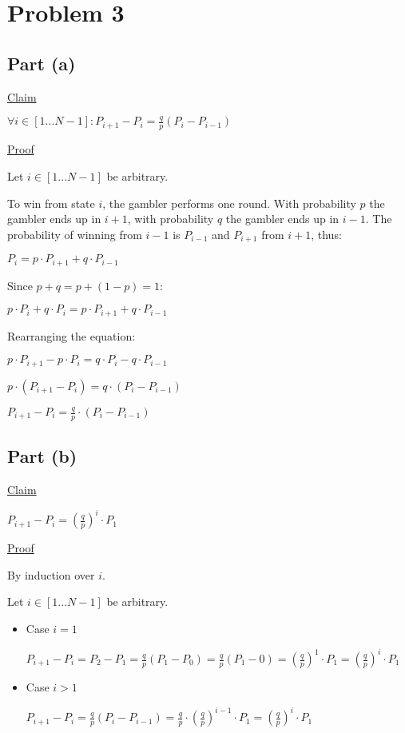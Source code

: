 \section*{Problem 3}

\subsection*{Part (a)}

\underline{Claim}

$\forall i \in [1...N - 1]: P_{i+1} - P_i = \frac{q}{p}(P_i - P_{i-1})$

\underline{Proof}

Let $i \in [1...N - 1]$ be arbitrary.

To win from state $i$, the gambler performs one round. With probability $p$ the gambler ends up in $i + 1$, with probability $q$ the gambler ends up in $i - 1$. The probability of winning from $i - 1$ is $P_{i-1}$ and $P_{i + 1}$ from $i + 1$, thus:

$P_i = p \cdot P_{i + 1} + q \cdot P_{i - 1}$

Since $p + q = p  + (1 - p) = 1$:

$p \cdot P_i + q \cdot P_i = p \cdot P_{i + 1} + q \cdot P_{i - 1}$

Rearranging the equation:

$p \cdot P_{i + 1} - p \cdot P_i = q \cdot P_i - q \cdot P_{i - 1}$

$p \cdot (P_{i + 1} - P_i) = q \cdot (P_i - P_{i - 1})$

$P_{i + 1} - P_i = \frac{q}{p} \cdot (P_i - P_{i - 1})$

\subsection*{Part (b)}

\underline{Claim}

$P_{i + 1} - P_i = \left(\frac{q}{p}\right)^i \cdot P_1$

\underline{Proof}

By induction over $i$. 

Let $i \in [1...N - 1]$ be arbitrary.

\begin{itemize}
    \item Case $i = 1$
    
    $P_{i + 1} - P_i = P_2 - P_1 
    = \frac{q}{p}(P_1 - P_0) = \frac{q}{p}(P_1 - 0) 
    = \left(\frac{q}{p}\right)^1 \cdot P_1 
    = \left(\frac{q}{p}\right)^i \cdot P_1$
    
    \item Case $i > 1$
    
    $P_{i + 1} - P_i
    = \frac{q}{p}(P_{i} - P_{i - 1})
    = \frac{q}{p} \cdot \left(\frac{q}{p}\right)^{i - 1} \cdot P_1
    = \left(\frac{q}{p}\right)^i \cdot P_1$
    
\end{itemize}

